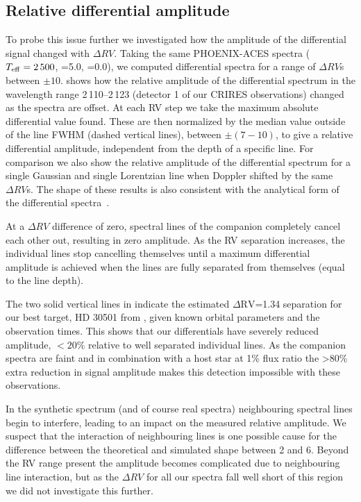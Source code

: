 \subsection{Relative differential amplitude}
To probe this issue further we investigated how the amplitude of the differential signal changed with \(\Delta {RV}\). Taking the same {PHOENIX-ACES} spectra (\(T_{\mathrm{eff}}{}=2\,500\)\K{}, \logg{}=5.0, \feh{}=0.0), we computed differential spectra for a range of \(\Delta {RV}\)s between \(\pm10\)\kmps{}.  shows how the relative amplitude of the differential spectrum in the wavelength range 2\,110--2\,123\nm{} (detector 1 of our {CRIRES} observations) changed as the spectra are offset. At each {RV} step we take the maximum absolute differential value found. These are then normalized by the median value outside of the line {FWHM} (dashed vertical lines), between \(\pm(7-10)\)\kmps{}, to give a relative differential amplitude, independent from the depth of a specific line. For comparison we also show the relative amplitude of the differential spectrum for a single Gaussian and single Lorentzian line when Doppler shifted by the same \(\Delta {RV}\)s. The shape of these results is also consistent with the analytical form of the differential spectra~\citet[][eqn.~A.1]{ferluga_separating_1997}.

At a \(\Delta {RV}\) difference of zero, spectral lines of the companion completely cancel each other out, resulting in zero amplitude. As the {RV} separation increases, the individual lines stop cancelling themselves until a maximum differential amplitude is achieved when the lines are fully separated from themselves (equal to the line depth).

The two solid vertical lines in  indicate the estimated \(\Delta \textrm{RV}\)=1.34\kmps{} separation for our best target, {HD 30501} from , given known orbital parameters and the observation times. This shows that our differentials have severely reduced amplitude, \(<20\%\) relative to well separated individual lines. As the companion spectra are faint and in combination with a host star at 1\% flux ratio the >80\% extra reduction in signal amplitude makes this detection impossible with these observations.

In the synthetic spectrum (and of course real spectra) neighbouring spectral lines begin to interfere, leading to an impact on the measured relative amplitude. We suspect that the interaction of neighbouring lines is one possible cause for the difference between the theoretical and simulated shape between 2 and 6\kmps{}. Beyond the {RV} range present the amplitude becomes complicated due to neighbouring line interaction, but as the \(\Delta {RV}\) for all our spectra fall well short of this region we did not investigate this further.

